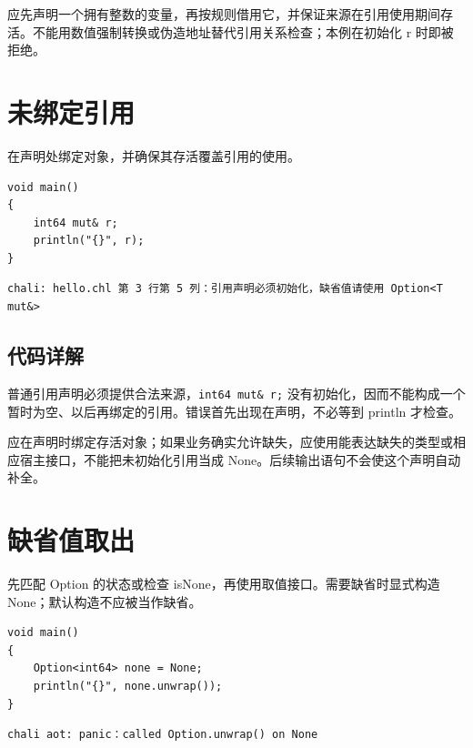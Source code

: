 应先声明一个拥有整数的变量，再按规则借用它，并保证来源在引用使用期间存活。不能用数值强制转换或伪造地址替代引用关系检查；本例在初始化 r 时即被拒绝。

\section{未绑定引用}

在声明处绑定对象，并确保其存活覆盖引用的使用。

\par
\medskip
\begin{lstlisting}[style=chali]
void main()
{
    int64 mut& r;
    println("{}", r);
}
\end{lstlisting}
\par
\medskip

\par
\medskip
\begin{lstlisting}[style=out]
chali: hello.chl 第 3 行第 5 列：引用声明必须初始化，缺省值请使用 Option<T mut&>
\end{lstlisting}
\par
\medskip

\subsection*{代码详解}

普通引用声明必须提供合法来源，\texttt{int64 mut\& r;} 没有初始化，因而不能构成一个暂时为空、以后再绑定的引用。错误首先出现在声明，不必等到 println 才检查。

应在声明时绑定存活对象；如果业务确实允许缺失，应使用能表达缺失的类型或相应宿主接口，不能把未初始化引用当成 None。后续输出语句不会使这个声明自动补全。

\section{缺省值取出}

先匹配 Option 的状态或检查 isNone，再使用取值接口。需要缺省时显式构造 None；默认构造不应被当作缺省。

\par
\medskip
\begin{lstlisting}[style=chali]
void main()
{
    Option<int64> none = None;
    println("{}", none.unwrap());
}
\end{lstlisting}
\par
\medskip

\par
\medskip
\begin{lstlisting}[style=out]
chali aot: panic：called Option.unwrap() on None
\end{lstlisting}
\par
\medskip

